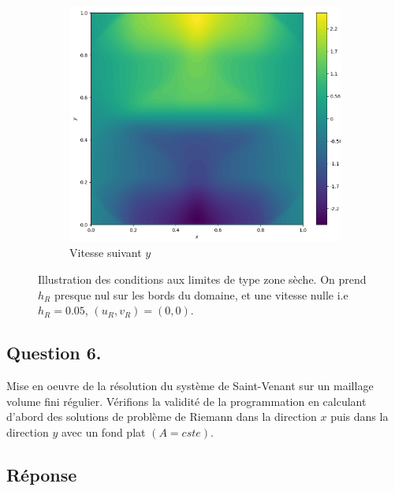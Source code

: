 \documentclass[
	french,
	11pt, %
]{fphw}
\begin{document}
\begin{figure}[H]
\begin{subfigure}{0.32\textwidth}
		\label{fig:Bord3u}
	\end{subfigure}
	\begin{subfigure}{0.32\textwidth}
		\centering
		\includegraphics[width=\textwidth,height=0.85\textwidth]{Bord3v.png}
		\caption{Vitesse suivant $y$}
		\label{fig:Bord3v}
	\end{subfigure}
	\caption{Illustration des conditions aux limites de type zone sèche. On prend $h_R$ presque nul sur les bords du domaine, et une vitesse nulle i.e $h_R=0.05$, $(u_R,v_R)=(0,0)$.}
	\label{fig:Bord3}
\end{figure}


\subsection*{Question 6.}

\begin{problem}
	Mise en oeuvre de la résolution du système de Saint-Venant sur un maillage volume fini régulier. Vérifions la validité de la programmation en calculant d'abord des solutions de problème de Riemann dans la direction $x$ puis dans la direction $y$ avec un fond plat $(A = cste)$.
\end{problem}

\subsection*{Réponse} 
\end{document}
